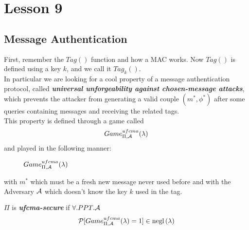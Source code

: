 \chapter*{Lesson 9}
\section{Message Authentication}
First, remember the $Tag()$ function and how a MAC works.
Now $Tag()$ is defined using a key $k$, and we call it $Tag_{k}()$.\\
In particular we are looking for a cool property of a message authentication
protocol, called \textbf{ \textit{universal unforgeability against
chosen-message attacks}}, which prevents the attacker from generating a valid
couple $(m^{*}, \phi^{*})$ after some queries containing messages and receiving
the related tags.\\

This property is defined through a game called 
\[
    Game_{\Pi, \mathcal{A}}^{ufcma}(\lambda)
\]
and played in the following manner:

\begin{figure}[h!]
   \centering
   \sdinit{}
   \caption{$Game_{\Pi, \mathcal{A}}^{ufcma}(\lambda)$}
\end{figure}

with $m^{*}$ which must be a fresh new message never used before and with the
Adversary $\mathcal{A}$ which doesn't know the key $k$ used in the tag.\\

\begin{definition}
    $\Pi$ is \textbf{ \textit{ufcma-secure} } if $ \forall.PPT.\mathcal{A}$ 
    \[
        \mathcal{P} [ Game_{\Pi, \mathcal{A}}^{ufcma}(\lambda)=1 ] \in \mathrm{negl}\left({\lambda}\right)  
    \]
\end{definition}

